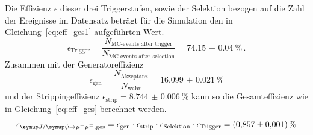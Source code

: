 %
Die Effizienz $\epsilon$ dieser drei Triggerstufen, sowie der Selektion bezogen auf die Zahl der Ereignisse im Datensatz beträgt für die Simulation den in Gleichung~\eqref{eq:eff_ges1} aufgeführten Wert.
%
\begin{equation}
  \epsilon_\text{Trigger}=\frac{N_\text{MC-events after trigger}}{N_\text{MC-events after selection}}=\SI{74.15(4)}{\percent} \, .%
  \label{eq:eff_ges1}
\end{equation}
%
Zusammen mit der Generatoreffizienz
%
\begin{equation}
  \epsilon_\text{gen}=\frac{N_\text{Akzeptanz}}{N_\text{wahr}}=\SI{16.099(21)}{\percent}
\end{equation}
%
und der Strippingeffizienz $\epsilon_\text{strip}=\SI{8.744(6)}{\percent}$ kann so die Gesamteffizienz wie in Gleichung~\eqref{eq:eff_ges} berechnet werden.
%
\begin{equation}
  \epsilon_{\kontroll, \text{ges}}
  =\epsilon_\text{gen}\cdot\epsilon_\text{strip}\cdot\epsilon_\text{Selektion}\cdot\epsilon_\text{Trigger}=\SI{0.857(1)}{\percent}
  \label{eq:eff_ges}
\end{equation}
